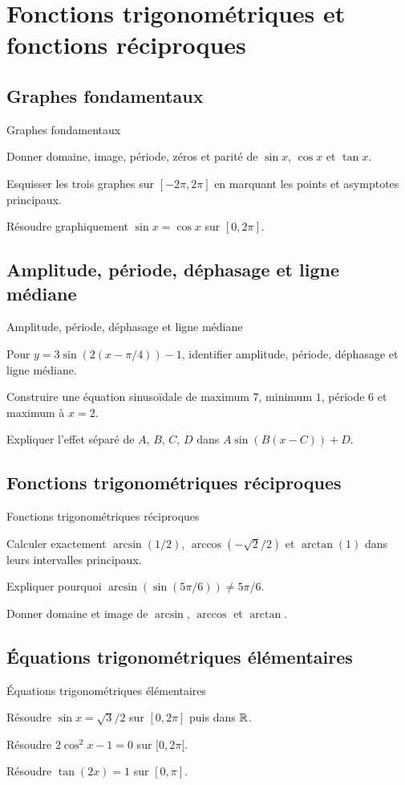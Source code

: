 \chapter{Fonctions trigonométriques et fonctions réciproques}
\label{workbook:chapter:16}
\section{Graphes fondamentaux}
\label{workbook:section:16.01}
\begin{exerciseblock}{Graphes fondamentaux}
\item Donner domaine, image, période, zéros et parité de $\sin x$, $\cos x$ et $\tan x$.
\item Esquisser les trois graphes sur $[-2\pi,2\pi]$ en marquant les points et asymptotes principaux.
\item Résoudre graphiquement $\sin x=\cos x$ sur $[0,2\pi]$.
\end{exerciseblock}
\section{Amplitude, période, déphasage et ligne médiane}
\label{workbook:section:16.02}
\begin{exerciseblock}{Amplitude, période, déphasage et ligne médiane}
\item Pour $y=3\sin(2(x-\pi/4))-1$, identifier amplitude, période, déphasage et ligne médiane.
\item Construire une équation sinusoïdale de maximum $7$, minimum $1$, période $6$ et maximum à $x=2$.
\item Expliquer l'effet séparé de $A$, $B$, $C$, $D$ dans $A\sin(B(x-C))+D$.
\end{exerciseblock}
\section{Fonctions trigonométriques réciproques}
\label{workbook:section:16.03}
\begin{exerciseblock}{Fonctions trigonométriques réciproques}
\item Calculer exactement $\arcsin(1/2)$, $\arccos(-\sqrt2/2)$ et $\arctan(1)$ dans leurs intervalles principaux.
\item Expliquer pourquoi $\arcsin(\sin(5\pi/6))\neq5\pi/6$.
\item Donner domaine et image de $\arcsin$, $\arccos$ et $\arctan$.
\end{exerciseblock}
\section{Équations trigonométriques élémentaires}
\label{workbook:section:16.04}
\begin{exerciseblock}{Équations trigonométriques élémentaires}
\item Résoudre $\sin x=\sqrt3/2$ sur $[0,2\pi]$ puis dans $\mathbb{R}$.
\item Résoudre $2\cos^2x-1=0$ sur $[0,2\pi[$.
\item Résoudre $\tan(2x)=1$ sur $[0,\pi]$.
\end{exerciseblock}
